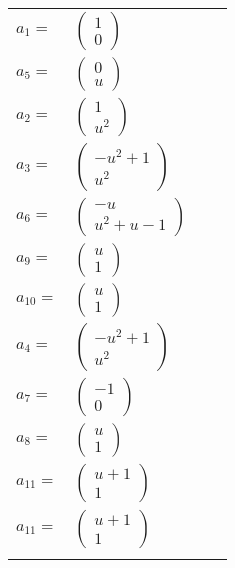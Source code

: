 \documentclass[1p]{elsarticle_modified}
\theoremstyle{definition}
\begin{document}
\begin{tabular}{m{7pt} m{180pt} m{7pt} m{180pt} }
\flushright $a_{1}=$&$\begin{pmatrix}1\\0\end{pmatrix}$ \\
\flushright $a_{5}=$&$\begin{pmatrix}0\\u\end{pmatrix}$ \\
\flushright $a_{2}=$&$\begin{pmatrix}1\\u^2\end{pmatrix}$ \\
\flushright $a_{3}=$&$\begin{pmatrix}- u^2+1\\u^2\end{pmatrix}$ \\
\flushright $a_{6}=$&$\begin{pmatrix}- u\\u^2+u-1\end{pmatrix}$ \\
\flushright $a_{9}=$&$\begin{pmatrix}u\\1\end{pmatrix}$ \\
\flushright $a_{10}=$&$\begin{pmatrix}u\\1\end{pmatrix}$ \\
\flushright $a_{4}=$&$\begin{pmatrix}- u^2+1\\u^2\end{pmatrix}$ \\
\flushright $a_{7}=$&$\begin{pmatrix}-1\\0\end{pmatrix}$ \\
\flushright $a_{8}=$&$\begin{pmatrix}u\\1\end{pmatrix}$ \\
\flushright $a_{11}=$&$\begin{pmatrix}u+1\\1\end{pmatrix}$\\ \flushright $a_{11}=$&$\begin{pmatrix}u+1\\1\end{pmatrix}$\\&\end{tabular}
\end{document}
